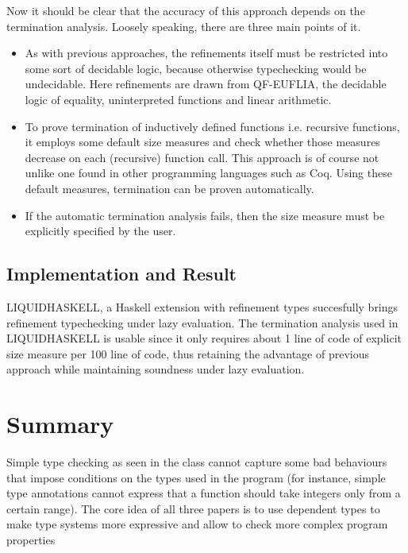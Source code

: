 \documentclass[a4paper,UKenglish]{lipics-v2016}
\begin{document}
      Now it should be clear that the accuracy of this approach depends on the
      termination analysis.  Loosely speaking, there are three main points of
      it.
      \begin{itemize}
        \item As with previous approaches, the refinements itself must be
          restricted into some sort of decidable logic, because otherwise
          typechecking would be undecidable.  Here refinements are drawn from
          QF-EUFLIA, the decidable logic of equality, uninterpreted
          functions and linear arithmetic.
        \item To prove termination of inductively defined functions i.e.
          recursive functions, it employs some default size measures and check
          whether those measures decrease on each (recursive) function call.
          This approach is of course not unlike one found in other programming
          languages such as Coq. Using these default measures, termination can
          be proven automatically.
        \item If the automatic termination analysis fails, then the size
          measure must be explicitly specified by the user.
      \end{itemize}

    \subsection{Implementation and Result}

      LIQUIDHASKELL, a Haskell extension with refinement types succesfully
      brings refinement typechecking under lazy evaluation.  The termination
      analysis used in LIQUIDHASKELL is usable since it only requires about 1
      line of code of explicit size measure per 100 line of code, thus
      retaining the advantage of previous approach while maintaining soundness
      under lazy evaluation.

\section{Summary}

Simple type checking as seen in the class cannot capture some bad behaviours
that impose conditions on the types used in the program (for instance, simple
type annotations cannot express that a function should take integers only from
a certain range). The core idea of all three papers is to use dependent types
to make type systems more expressive and allow to check more complex program
properties
\end{document}
